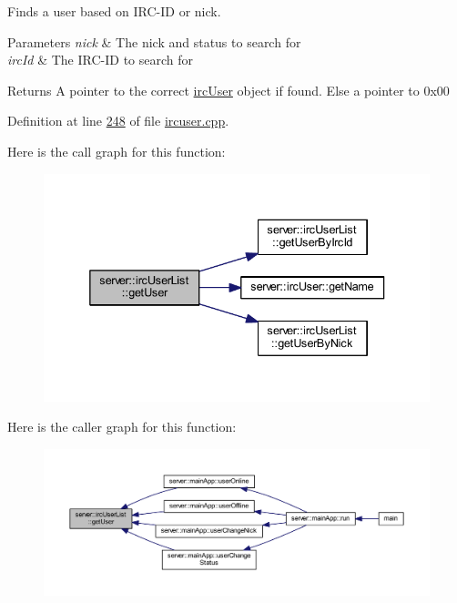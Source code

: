 Finds a user based on I\-R\-C-\/\-I\-D or nick. 


\begin{DoxyParams}{Parameters}
{\em nick} & The nick and status to search for \\
\hline
{\em irc\-Id} & The I\-R\-C-\/\-I\-D to search for \\
\hline
\end{DoxyParams}
\begin{DoxyReturn}{Returns}
A pointer to the correct \hyperlink{classserver_1_1irc_user}{irc\-User} object if found. Else a pointer to 0x00 
\end{DoxyReturn}


Definition at line \hyperlink{custom_irc_server_2ircuser_8cpp_source_l00248}{248} of file \hyperlink{custom_irc_server_2ircuser_8cpp_source}{ircuser.\-cpp}.



Here is the call graph for this function\-:\nopagebreak
\begin{figure}[H]
\begin{center}
\leavevmode
\includegraphics[width=336pt]{d4/d08/classserver_1_1irc_user_list_af2d5bdaf2ccd658679c933390500f0e2_cgraph}
\end{center}
\end{figure}




Here is the caller graph for this function\-:
\nopagebreak
\begin{figure}[H]
\begin{center}
\leavevmode
\includegraphics[width=350pt]{d4/d08/classserver_1_1irc_user_list_af2d5bdaf2ccd658679c933390500f0e2_icgraph}
\end{center}
\end{figure}


